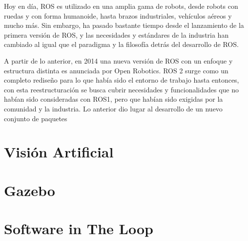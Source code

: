 Hoy en día, ROS es utilizado en una amplia gama de robots, desde robots con ruedas y con forma humanoide, hasta brazos industriales, vehículos aéreos y mucho más. Sin embargo, ha pasado bastante tiempo desde el lanzamiento de la primera versión de ROS, y las necesidades y estándares de la industria han cambiado al igual que el paradigma y la filosofía detrás del desarrollo de ROS.
   
A partir de lo anterior, en 2014 una nueva versión de ROS con un enfoque y estructura distinta es anunciada por Open Robotics.  ROS 2 surge como un completo rediseño para lo que había sido el entorno de trabajo hasta entonces, con esta reestructuración se busca cubrir necesidades y funcionalidades que no habían sido consideradas con  ROS1, pero que habían sido exigidas por la comunidad y la industria. Lo anterior dio lugar al desarrollo de un nuevo conjunto de paquetes 

\section{Visión Artificial}

\section{Gazebo}

\section{Software in The Loop}



